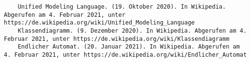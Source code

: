 \begin{lstlisting}
	Unified Modeling Language. (19. Oktober 2020). In Wikipedia. Abgerufen am 4. Februar 2021, unter https://de.wikipedia.org/wiki/Unified_Modeling_Language
	Klassendiagramm. (9. Dezember 2020). In Wikipedia. Abgerufen am 4. Februar 2021, unter https://de.wikipedia.org/wiki/Klassendiagramm
	Endlicher Automat. (20. Januar 2021). In Wikipedia. Abgerufen am 4. Februar 2021, unter https://de.wikipedia.org/wiki/Endlicher_Automat
\end{lstlisting}